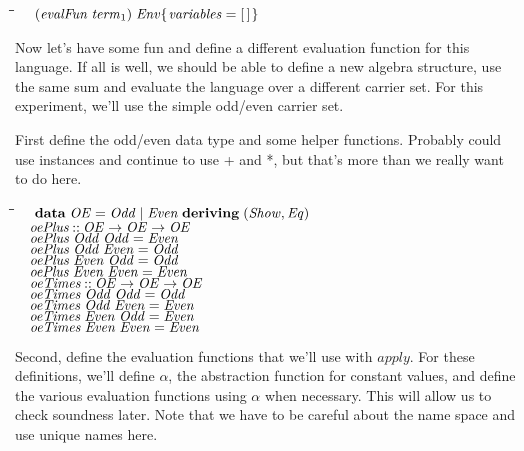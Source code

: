\documentclass[10pt]{article}
\newlength{\lwidth}\setlength{\lwidth}{4.5cm}
\newlength{\cwidth}\setlength{\cwidth}{8mm} %
\newcommand{\Conid}[1]{\mathit{#1}}
\newcommand{\Varid}[1]{\mathit{#1}}
\begin{document}
\begin{tabbing}
\qquad\=\hspace{\lwidth}\=\hspace{\cwidth}\=\+\kill
${\hskip1.00em\relax(\Varid{evalFun}\;\Varid{term}_1)\;\Conid{Env}\{\mskip1.5mu \Varid{variables}\mathrel{=}[\mskip1.5mu \mskip1.5mu]\mskip1.5mu\}}$
\end{tabbing}
Now let's have some fun and define a different evaluation function for
this language.  If all is well, we should be able to define a new
algebra structure, use the same sum and evaluate the language over a
different carrier set.  For this experiment, we'll use the simple
odd/even carrier set.

First define the odd/even data type and some helper functions.
Probably could use instances and continue to use + and *, but that's
more than we really want to do here.

\begin{tabbing}
\qquad\=\hspace{\lwidth}\=\hspace{\cwidth}\=\+\kill
${\hskip1.00em\relax\mathbf{data}\;\Conid{OE}\mathrel{=}\Conid{Odd}\mid \Conid{Even}\;\mathbf{deriving}\;(\Conid{Show},\Conid{Eq})}$\\
${}$\\
${\hskip1.00em\relax\Varid{oePlus}\mathbin{::}\Conid{OE}\to \Conid{OE}\to \Conid{OE}}$\\
${\hskip1.00em\relax\Varid{oePlus}\;\Conid{Odd}\;\Conid{Odd}\mathrel{=}\Conid{Even}}$\\
${\hskip1.00em\relax\Varid{oePlus}\;\Conid{Odd}\;\Conid{Even}\mathrel{=}\Conid{Odd}}$\\
${\hskip1.00em\relax\Varid{oePlus}\;\Conid{Even}\;\Conid{Odd}\mathrel{=}\Conid{Odd}}$\\
${\hskip1.00em\relax\Varid{oePlus}\;\Conid{Even}\;\Conid{Even}\mathrel{=}\Conid{Even}}$\\
${}$\\
${\hskip1.00em\relax\Varid{oeTimes}\mathbin{::}\Conid{OE}\to \Conid{OE}\to \Conid{OE}}$\\
${\hskip1.00em\relax\Varid{oeTimes}\;\Conid{Odd}\;\Conid{Odd}\mathrel{=}\Conid{Odd}}$\\
${\hskip1.00em\relax\Varid{oeTimes}\;\Conid{Odd}\;\Conid{Even}\mathrel{=}\Conid{Even}}$\\
${\hskip1.00em\relax\Varid{oeTimes}\;\Conid{Even}\;\Conid{Odd}\mathrel{=}\Conid{Even}}$\\
${\hskip1.00em\relax\Varid{oeTimes}\;\Conid{Even}\;\Conid{Even}\mathrel{=}\Conid{Even}}$
\end{tabbing}
Second, define the evaluation functions that we'll use with \ensuremath{\Varid{apply}}.
For these definitions, we'll define \ensuremath{\Varid{\alpha}}, the abstraction function
for constant values, and define the various evaluation functions using
\ensuremath{\Varid{\alpha}} when necessary.  This will allow us to check soundness later.
Note that we have to be careful about the name space and use unique
names here.
\end{document}
